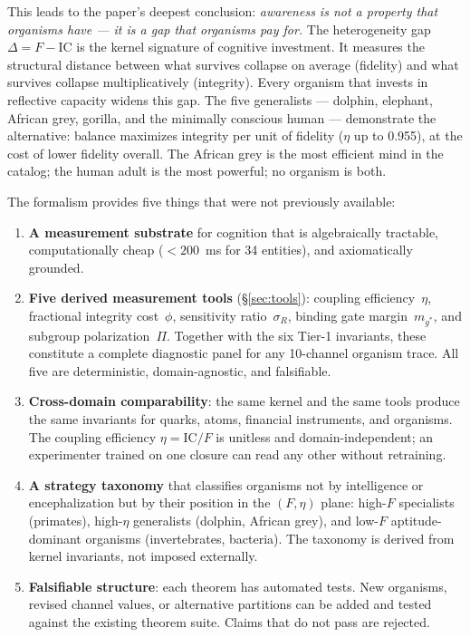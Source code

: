 \documentclass[
  aps,
  prd,
  twocolumn,
  superscriptaddress,
  nofootinbib,
  floatfix
]{revtex4-2}
\newcommand{\IC}{\mathrm{IC}}
\begin{document}
This leads to the paper's deepest conclusion:
\emph{awareness is not a property that organisms have ---
it is a gap that organisms pay for.}  The heterogeneity
gap $\Delta = F - \IC$ is the kernel signature of cognitive
investment.  It measures the structural distance between what
survives collapse on average (fidelity) and what survives
collapse multiplicatively (integrity).  Every organism that
invests in reflective capacity widens this gap.  The five
generalists --- dolphin, elephant, African grey, gorilla,
and the minimally conscious human --- demonstrate the
alternative: balance maximizes integrity per unit of
fidelity ($\eta$ up to 0.955), at the cost of lower fidelity
overall.  The African grey is the most efficient mind in the
catalog; the human adult is the most powerful; no organism
is both.

The formalism provides five things that were not previously
available:

\begin{enumerate}
\item \textbf{A measurement substrate} for cognition that is
  algebraically tractable, computationally cheap
  ($<200$~ms for 34 entities), and axiomatically grounded.

\item \textbf{Five derived measurement tools}
  (\S\ref{sec:tools}): coupling efficiency~$\eta$,
  fractional integrity cost~$\phi$, sensitivity
  ratio~$\sigma_R$, binding gate margin~$m_{g^*}$,
  and subgroup polarization~$\Pi$.  Together with the
  six Tier-1 invariants, these constitute a complete
  diagnostic panel for any 10-channel organism trace.
  All five are deterministic, domain-agnostic, and
  falsifiable.

\item \textbf{Cross-domain comparability}: the same kernel
  and the same tools produce the same invariants for quarks,
  atoms, financial instruments, and organisms.  The
  coupling efficiency $\eta = \IC/F$ is unitless and
  domain-independent; an experimenter trained on one
  closure can read any other without retraining.

\item \textbf{A strategy taxonomy} that classifies organisms
  not by intelligence or encephalization but by their
  position in the $(F, \eta)$ plane: high-$F$ specialists
  (primates), high-$\eta$ generalists (dolphin, African grey),
  and low-$F$ aptitude-dominant organisms (invertebrates,
  bacteria).  The taxonomy is derived from kernel invariants,
  not imposed externally.

\item \textbf{Falsifiable structure}: each theorem has
  automated tests.  New organisms, revised channel values,
  or alternative partitions can be added and tested against
  the existing theorem suite.  Claims that do not pass
  are rejected.
\end{enumerate}
\end{document}
